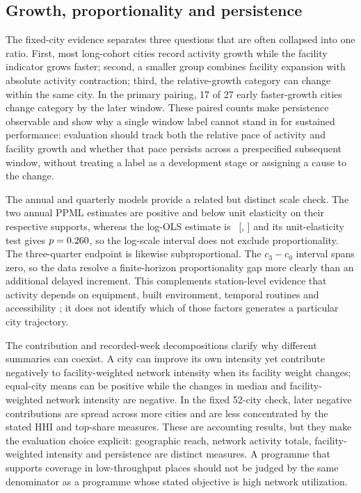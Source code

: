 \subsection{Growth, proportionality and persistence}
The fixed-city evidence separates three questions that are often collapsed into one ratio. First, most long-cohort cities record activity growth while the facility indicator grows faster; second, a smaller group combines facility expansion with absolute activity contraction; third, the relative-growth category can change within the same city. In the primary pairing, 17 of 27 early faster-growth cities change category by the later window. These paired counts make persistence observable and show why a single window label cannot stand in for sustained performance: evaluation should track both the relative pace of activity and facility growth and whether that pace persists across a prespecified subsequent window, without treating a label as a development stage or assigning a cause to the change.

The annual and quarterly models provide a related but distinct scale check. The two annual PPML estimates are positive and below unit elasticity on their respective supports, whereas the log-OLS estimate is \AnnualOLSBeta\ [\AnnualOLSLow, \AnnualOLSHigh] and its unit-elasticity test gives $p=0.260$, so the log-scale interval does not exclude proportionality. The three-quarter endpoint is likewise subproportional. The $c_3-c_0$ interval spans zero, so the data resolve a finite-horizon proportionality gap more clearly than an additional delayed increment. This complements station-level evidence that activity depends on equipment, built environment, temporal routines and accessibility \citep{wolbertus2018,zhao2024_utilization,du2024_accessibility,zheng2025_landuse}; it does not identify which of those factors generates a particular city trajectory.

The contribution and recorded-week decompositions clarify why different summaries can coexist. A city can improve its own intensity yet contribute negatively to facility-weighted network intensity when its facility weight changes; equal-city means can be positive while the changes in median and facility-weighted network intensity are negative. In the fixed 52-city check, later negative contributions are spread across more cities and are less concentrated by the stated HHI and top-share measures. These are accounting results, but they make the evaluation choice explicit: geographic reach, network activity totals, facility-weighted intensity and persistence are distinct measures. A programme that supports coverage in low-throughput places should not be judged by the same denominator as a programme whose stated objective is high network utilization.

